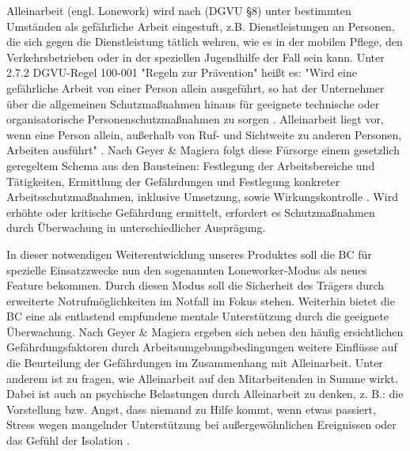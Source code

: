 \documentclass[thesis.tex]{subfiles}
\begin{document}
Alleinarbeit (engl. Lonework) wird nach (DGVU §8) \cite[§8]{Vorschrift1_DGUV} unter bestimmten Umständen als gefährliche Arbeit eingestuft, z.B. Dienstleistungen an Personen, die sich gegen die Dienstleistung tätlich wehren, wie es in der mobilen Pflege, den Verkehrsbetrieben oder in der speziellen Jugendhilfe der Fall sein kann.
Unter 2.7.2 DGVU-Regel 100-001 "Regeln zur Prävention" heißt es: "Wird eine gefährliche Arbeit von einer Person allein ausgeführt, so hat der Unternehmer über die allgemeinen Schutzmaßnahmen hinaus für geeignete technische oder organisatorische Personenschutzmaßnahmen zu sorgen \cite[§8(2)]{Vorschrift1_DGUV}.
Alleinarbeit liegt vor, wenn eine Person allein, außerhalb von Ruf- und Sichtweite zu anderen Personen, Arbeiten ausführt" \cite[S.42]{Regel_100-001}.
Nach Geyer \& Magiera folgt diese Fürsorge einem gesetzlich geregeltem Schema aus den Bausteinen: Festlegung der Arbeitsbereiche und Tätigkeiten, Ermittlung der Gefährdungen und Festlegung konkreter Arbeitsschutzmaßnahmen, inklusive Umsetzung, sowie Wirkungskontrolle \cite[vgl. S.42 ff.]{GeyerMagiera2022}.
Wird erhöhte oder kritische Gefährdung ermittelt, erfordert es Schutzmaßnahmen durch Überwachung in unterschiedlicher Ausprägung.

In dieser notwendigen Weiterentwicklung unseres Produktes soll die BC für spezielle Einsatzzwecke nun den sogenannten Loneworker-Modus als neues Feature bekommen.
Durch diesen Modus soll die Sicherheit des Trägers durch erweiterte Notrufmöglichkeiten im Notfall im Fokus stehen.
Weiterhin bietet die BC eine als entlastend empfundene mentale Unterstützung durch die geeignete Überwachung.
Nach Geyer \& Magiera ergeben sich neben den häufig ersichtlichen Gefährdungsfaktoren durch Arbeitsumgebungsbedingungen weitere Einflüsse auf die Beurteilung der Gefährdungen im Zusammenhang mit Alleinarbeit.
Unter anderem ist zu fragen, wie Alleinarbeit auf den Mitarbeitenden in Summe wirkt.
Dabei ist auch an psychische Belastungen durch Alleinarbeit zu denken, z. B.: die Vorstellung bzw. Angst, dass niemand zu Hilfe kommt, wenn etwas passiert, Stress wegen mangelnder Unterstützung bei außergewöhnlichen Ereignissen oder das Gefühl der Isolation \cite[vgl. S.45]{GeyerMagiera2022}.
\end{document}

